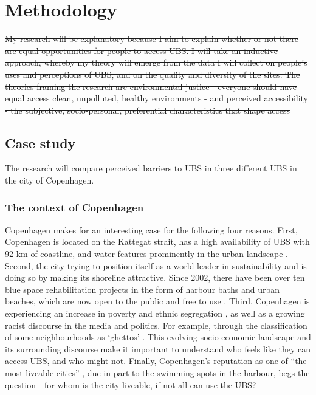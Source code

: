 \documentclass{article}
\begin{document}
\section{Methodology}

\sout{My research will be explanatory because I aim to explain whether or not there are equal opportunities for people to access UBS. I will take an inductive approach, whereby my theory will emerge from the data I will collect on people’s uses and perceptions of UBS, and on the quality and diversity of the sites. The theories framing the research are environmental justice - everyone should have equal access clean, unpolluted, healthy environments - and perceived accessibility - the subjective, socio-personal, preferential characteristics that shape access}

\subsection{Case study}

The research will compare perceived barriers to UBS in three different UBS in the city of Copenhagen.

\subsubsection{The context of Copenhagen}

Copenhagen makes for an interesting case for the following four reasons. First, Copenhagen is located on the Kattegat strait, has a high availability of UBS with 92 km of coastline, and water features prominently in the urban landscape \parencite{comertler2017greens}. Second, the city trying to position itself as a world leader in sustainability and is doing so by making its shoreline attractive. Since 2002, there have been over ten blue space rehabilitation projects in the form of harbour baths and urban beaches, which are now open to the public and free to use \parencite{visitcopenhagen_baths}. Third, Copenhagen is experiencing an increase in poverty and ethnic segregation \parencite{moller2015socioeconomic}, as well as a growing racist discourse in the media and politics. For example, through the classification of some neighbourhoods as ‘ghettos’ \parencite{simonsen2008practice}. This evolving socio-economic landscape and its surrounding discourse make it important to understand who feels like they can access UBS, and who might not. Finally, Copenhagen’s reputation as one of ``the most liveable cities'' \parencite{visitdenmark_2021}, due in part to the swimming spots in the harbour, begs the question - for whom is the city liveable, if not all can use the UBS?
\end{document}
